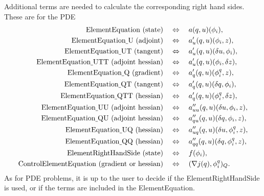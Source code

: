 {Additional terms are needed to calculate the corresponding 
right hand sides. These are for the PDE
\begin{align*}
\text{ElementEquation (state)} \quad &\Leftrightarrow \quad a(q,u)(\phi_i), \\
\text{ElementEquation\underline{ }U (adjoint)} \quad 
&\Leftrightarrow \quad a_u'(q,u)(\phi_i, z), \\ 
\text{ElementEquation\underline{ }UT (tangent)} \quad 
&\Leftrightarrow \quad a_u'(q,u)(\delta u, \phi_i), \\
\text{ElementEquation\underline{ }UTT (adjoint hessian)} \quad 
&\Leftrightarrow \quad  a_u'(q,u)(\phi_i, \delta z), \\
\text{ElementEquation\underline{ }Q (gradient)} \quad 
&\Leftrightarrow \quad a_q'(q,u)(\phi^q_i,z), \\
\text{ElementEquation\underline{ }QT (tangent)} \quad 
&\Leftrightarrow \quad a_q'(q,u)(\delta q, \phi_i), \\
\text{ElementEquation\underline{ }QTT (hessian)} \quad 
&\Leftrightarrow \quad a_{q}'(q,u)(\phi^q_i,\delta z), \\
\text{ElementEquation\underline{ }UU (adjoint hessian)} \quad 
&\Leftrightarrow \quad a_{uu}''(q,u)(\delta u, \phi_i, z), \\
\text{ElementEquation\underline{ }QU (adjoint hessian)} \quad 
&\Leftrightarrow \quad a_{qu}''(q,u)(\delta q, \phi_i, z), \\
\text{ElementEquation\underline{ }UQ (hessian)} \quad 
&\Leftrightarrow \quad a_{uq}''(q,u)(\delta u, \phi^q_i, z),\\
\text{ElementEquation\underline{ }QQ (hessian)} \quad 
&\Leftrightarrow \quad a_{qq}''(q,u)(\delta q, \phi^q_i, z),\\
\text{ElementRightHandSide (state)} \quad 
&\Leftrightarrow \quad f(\phi_i), \\
\text{ControlElementEquation (gradient or hessian)} \quad 
&\Leftrightarrow \quad (\nabla j(q),\phi^q_i)_Q.
\end{align*}
As for PDE problems, it is up to the user to decide if the ElementRightHandSide
is used, or if the terms are included in the ElementEquation. 

}
